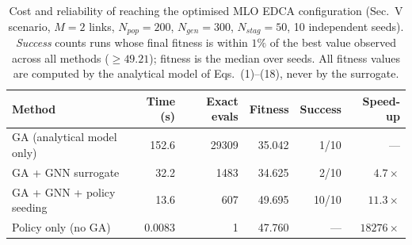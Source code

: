 \begin{table}[t]
\centering
\caption{Cost and reliability of reaching the optimised MLO EDCA configuration (Sec.~V scenario, $M=2$ links, $N_{pop}=200$, $N_{gen}=300$, $N_{stag}=50$, 10 independent seeds). \emph{Success} counts runs whose final fitness is within $1\%$ of the best value observed across all methods ($\geq 49.21$); fitness is the median over seeds. All fitness values are computed by the analytical model of Eqs.~(1)--(18), never by the surrogate.}
\label{tab:gnn_speedup}
\begin{tabular}{lrrrrr}
\toprule
Method & Time (s) & Exact evals & Fitness & Success & Speed-up \\
\midrule
GA (analytical model only) & 152.6 & 29309 & 35.042 & 1/10 & --- \\
GA + GNN surrogate & 32.2 & 1483 & 34.625 & 2/10 & $4.7\times$ \\
GA + GNN + policy seeding & 13.6 & 607 & 49.695 & 10/10 & $11.3\times$ \\
Policy only (no GA) & 0.0083 & 1 & 47.760 & --- & $18276\times$ \\
\bottomrule
\end{tabular}
\end{table}
